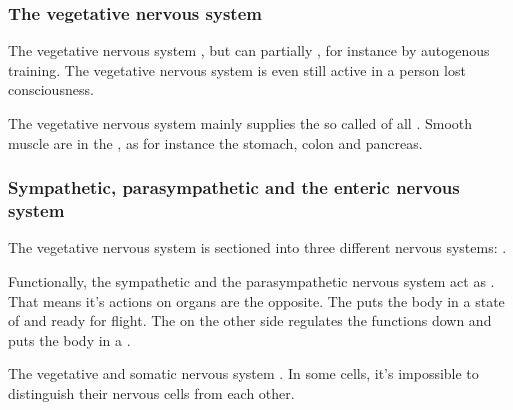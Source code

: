 
\begin{frame}
\frametitle{The vegetative nervous system}


The vegetative nervous system , but can partially , for instance by autogenous training. The vegetative nervous system is even still active in a person lost consciousness.

The vegetative nervous system mainly supplies the so called  of all . Smooth muscle are in the , as for instance the stomach, colon and pancreas.



\end{frame}


\begin{frame}
\frametitle{Sympathetic, parasympathetic and the enteric nervous system}


The vegetative nervous system is sectioned into three different nervous systems: .

Functionally, the sympathetic and the parasympathetic nervous system act as . That means it's actions on organs are the opposite. The  puts the body in a state of  and ready for flight. The  on the other side regulates the functions down and puts the body in a .

The vegetative and somatic nervous system . In some cells, it's impossible to distinguish their nervous cells from each other.
\end{frame}

